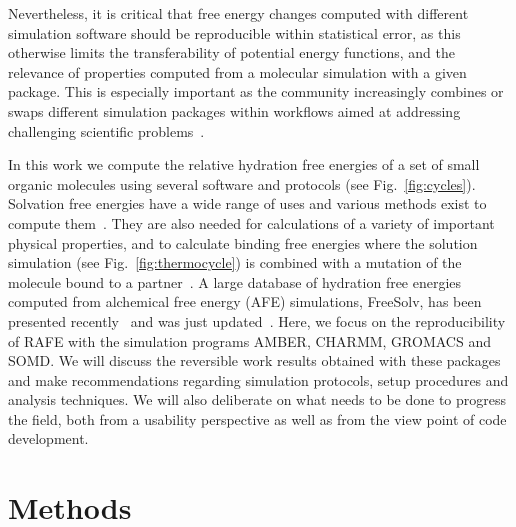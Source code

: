 \documentclass[journal=jctcce,manuscript=article]{achemso}
\begin{document}
Nevertheless, it is critical that free energy
changes computed with different simulation software should be reproducible
within statistical error, as this otherwise limits the transferability of
potential energy functions, and the relevance of properties computed from a
molecular simulation with a given package.  This is especially important as the community
increasingly combines or swaps different simulation packages within workflows
aimed at addressing challenging scientific
problems~\cite{Pronk:2011:CNP:2063384.2063465, doi:10.1021/ci8000937,
doi:10.1021/jp505332p, loeffler_fesetup:_2015,
DBLP:journals/corr/Balasubramanian16g}.

In this work we compute the relative hydration free energies of a
set of small organic molecules using several software and protocols (see Fig.~\ref{fig:cycles}).  Solvation free
energies have a wide range of uses and various methods exist to compute
them~\cite{Skyner:2015:PCCP}.  They are also needed for calculations of a
variety of important physical properties, and to calculate binding free
energies where the solution simulation  (see Fig.~\ref{fig:thermocycle}) is
combined with a mutation of the molecule bound to a
partner~\cite{Skyner:2015:PCCP}.  A large database of hydration free energies
computed from alchemical free energy (AFE) simulations, FreeSolv, has been
presented recently~\cite{Mobley2014} and was just
updated~\cite{doi:10.1021/acs.jced.7b00104}.  Here, we focus on the
reproducibility of RAFE with the simulation programs AMBER, CHARMM, GROMACS and
SOMD.  We will discuss the reversible work results obtained with these packages
and make recommendations regarding simulation protocols, setup procedures and
analysis techniques.  We will also deliberate on what needs to be done to
progress the field, both from a usability perspective as well as from the view
point of code development.


\section{Methods}
\label{sec:methods}
\end{document}
